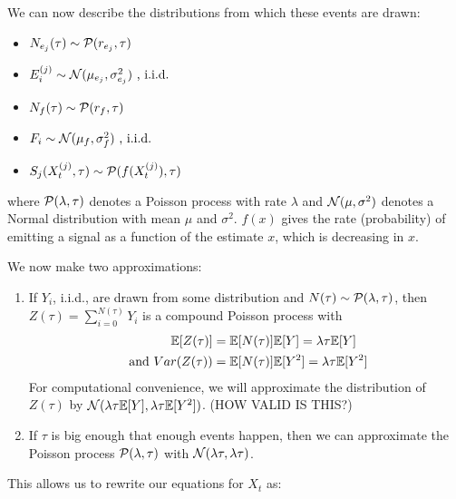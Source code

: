 \documentclass{article}
\begin{document}
We can now describe the distributions from which these events are drawn:
\begin{itemize}
\item $N_{e_j}(\tau)\sim {\mathcal{ P}}(r_{e_j},\tau)$
\item $E_i^{(j)}\sim {\mathcal{ N}}(\mu_{e_j},\sigma^2_{e_j}) \text{ , i.i.d.}$
\item $N_f(\tau)\sim{\mathcal{ P}}(r_f,\tau)$
\item $F_i\sim{\mathcal{ N}}(\mu_f,\sigma^2_f) \text{ , i.i.d.}$
\item $S_j(X_t^{(j)},\tau)\sim{\mathcal{ P}}(f(X_t^{(j)}),\tau)$
\end{itemize}
where ${\mathcal{ P}}(\lambda,\tau)$ denotes a Poisson process with rate $\lambda$ and ${\mathcal{ N}}(\mu,\sigma^2)$ denotes a Normal distribution with mean $\mu$ and $\sigma^2$.  $f(x)$ gives the rate (probability) of emitting a signal as a function of the estimate $x$, which is decreasing in $x$.

We now make two approximations:
\begin{enumerate}
\item If $Y_i$, i.i.d., are drawn from some distribution and $N(\tau)\sim{\mathcal{ P}}(\lambda,\tau)$, then $Z(\tau)=\sum_{i=0}^{N(\tau)}Y_i$ is a compound Poisson process with 
\begin{align*}
{\mathbb{E}}[Z(\tau)]&={\mathbb{E}}[N(\tau)]{\mathbb{E}}[Y]=\lambda\tau{\mathbb{E}}[Y]
\\ \text{ and } Var(Z(\tau))&={\mathbb{E}}[N(\tau)]{\mathbb{E}}[Y^2]=\lambda\tau{\mathbb{E}}[Y^2]
\end{align*}
For computational convenience, we will approximate the distribution of $Z(\tau)$ by ${\mathcal{ N}}(\lambda\tau{\mathbb{E}}[Y],\lambda\tau{\mathbb{E}}[Y^2])$. (HOW VALID IS THIS?)

\item If $\tau$ is big enough that enough events happen, then we can approximate the Poisson process ${\mathcal{ P}}(\lambda,\tau)$ with ${\mathcal{ N}}(\lambda\tau,\lambda\tau)$.

\end{enumerate}

This allows us to rewrite our equations for $X_t$ as:
\end{document}
